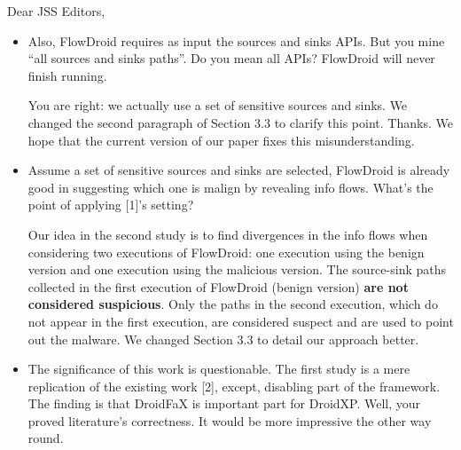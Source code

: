 \documentclass[12pt,english]{scrlttr2}
\begin{document}
\begin{letter}{Dear JSS Editors,}
\begin{itemize}
\vspace{0.2cm}

\item Also, FlowDroid requires as input the sources and sinks APIs. But you mine ``all sources and sinks 
paths''. Do you mean all APIs? FlowDroid will never finish running. 

\vspace{0.2cm}

{\color{blue}{\bf Answer.} You are right: we actually use a set of sensitive sources and sinks. We changed the second paragraph of Section 3.3 to clarify this point. Thanks. We hope that the current version of our paper fixes this misunderstanding.}

\vspace{0.2cm}
  
\item Assume a set of sensitive sources and sinks are selected, 
FlowDroid is already good in suggesting which one is malign by revealing info flows. What's the point of applying [1]'s setting?


\vspace{0.2cm}

{\color{blue}{\bf Answer.} Our idea in the second study is to find divergences in the info flows when considering two executions of FlowDroid: one execution using the benign version and one execution using the malicious version. The source-sink paths collected in the first execution of FlowDroid (benign version)
 {\bf are not considered suspicious}. Only the paths in the second execution, which do not appear in the first execution, are considered suspect and are used to point out the malware. We changed Section 3.3 to detail our approach better.}

\vspace{0.2cm}

\item The significance of this work is questionable. The first study is a mere replication of the existing work [2], except, disabling 
part of the framework. The finding is that DroidFaX is important part for DroidXP. Well, your proved literature's correctness. 
It would be more impressive the other way round.


\vspace{0.2cm}


\end{itemize}
\end{letter}
\end{document}
